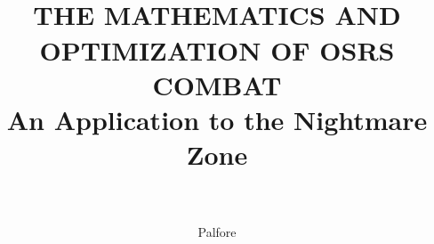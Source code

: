 \documentclass[12pt,a4paper]{article}
\author{Palfore}
\title{
	\HRule{0.5pt}\\
	\LARGE \textbf{\uppercase{The Mathematics and Optimization of OSRS Combat}}\\
	An Application to the Nightmare Zone\\
	\HRule{2pt}\\
}
\begin{document}
\begin{titlepage}
	\maketitle
\end{titlepage}
\end{document}
